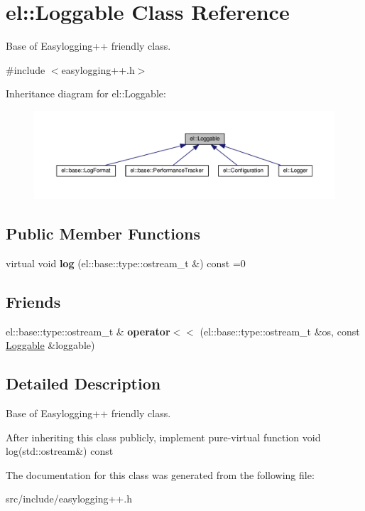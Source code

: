 \hypertarget{classel_1_1_loggable}{}\section{el\+:\+:Loggable Class Reference}
\label{classel_1_1_loggable}


Base of Easylogging++ friendly class.  




{\ttfamily \#include $<$easylogging++.\+h$>$}



Inheritance diagram for el\+:\+:Loggable\+:
\nopagebreak
\begin{figure}[H]
\begin{center}
\leavevmode
\includegraphics[width=350pt]{classel_1_1_loggable__inherit__graph}
\end{center}
\end{figure}
\subsection*{Public Member Functions}
\begin{DoxyCompactItemize}
\item 
\mbox{\label{classel_1_1_loggable_ad8a2e0ebc11e4bd00ef49fc67db3d59e}} 
virtual void {\bfseries log} (el\+::base\+::type\+::ostream\+\_\+t \&) const =0
\end{DoxyCompactItemize}
\subsection*{Friends}
\begin{DoxyCompactItemize}
\item 
\mbox{\label{classel_1_1_loggable_a00722a386f498be3ebece2e266fb0f05}} 
el\+::base\+::type\+::ostream\+\_\+t \& {\bfseries operator$<$$<$} (el\+::base\+::type\+::ostream\+\_\+t \&os, const \hyperlink{classel_1_1_loggable}{Loggable} \&loggable)
\end{DoxyCompactItemize}


\subsection{Detailed Description}
Base of Easylogging++ friendly class. 

After inheriting this class publicly, implement pure-\/virtual function {\ttfamily void log(std\+::ostream\&) const} 

The documentation for this class was generated from the following file\+:\begin{DoxyCompactItemize}
\item 
src/include/easylogging++.\+h\end{DoxyCompactItemize}
